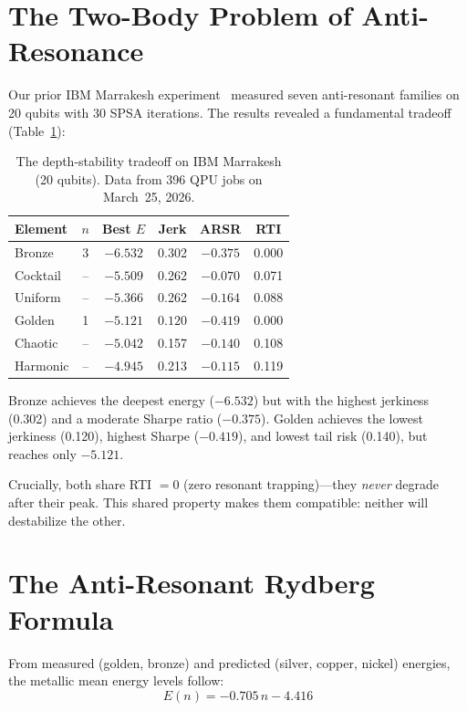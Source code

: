 \documentclass[twocolumn,showpacs,preprintnumbers,amsmath,amssymb,aps,prl]{revtex4-2}
\begin{document}
\section{The Two-Body Problem of Anti-Resonance}
\label{sec:twobody}

Our prior IBM Marrakesh experiment~\cite{knopp2026qgp} measured seven anti-resonant families on 20 qubits with 30 SPSA iterations. The results revealed a fundamental tradeoff (Table~\ref{tab:tradeoff}):

\begin{table}[h]
\centering
\caption{The depth-stability tradeoff on IBM Marrakesh (20 qubits). Data from 396 QPU jobs on March~25, 2026.}
\label{tab:tradeoff}
\begin{tabular}{lccccc}
\toprule
\textbf{Element} & $n$ & \textbf{Best $E$} & \textbf{Jerk} & \textbf{ARSR} & \textbf{RTI} \\
\midrule
Bronze & 3 & $\mathbf{-6.532}$ & 0.302 & $-0.375$ & 0.000 \\
Cocktail & -- & $-5.509$ & 0.262 & $-0.070$ & 0.071 \\
Uniform & -- & $-5.366$ & 0.262 & $-0.164$ & 0.088 \\
Golden & 1 & $-5.121$ & $\mathbf{0.120}$ & $\mathbf{-0.419}$ & 0.000 \\
Chaotic & -- & $-5.042$ & 0.157 & $-0.140$ & 0.108 \\
Harmonic & -- & $-4.945$ & 0.213 & $-0.115$ & 0.119 \\
\bottomrule
\end{tabular}
\end{table}

Bronze achieves the deepest energy ($-6.532$) but with the highest jerkiness (0.302) and a moderate Sharpe ratio ($-0.375$). Golden achieves the lowest jerkiness (0.120), highest Sharpe ($-0.419$), and lowest tail risk (0.140), but reaches only $-5.121$.

Crucially, both share RTI $= 0$ (zero resonant trapping)---they \emph{never} degrade after their peak. This shared property makes them compatible: neither will destabilize the other.


\section{The Anti-Resonant Rydberg Formula}
\label{sec:rydberg}

From measured (golden, bronze) and predicted (silver, copper, nickel) energies, the metallic mean energy levels follow:
\begin{equation}
    E(n) = -0.705\,n - 4.416
    \label{eq:rydberg}
\end{equation}
\end{document}

